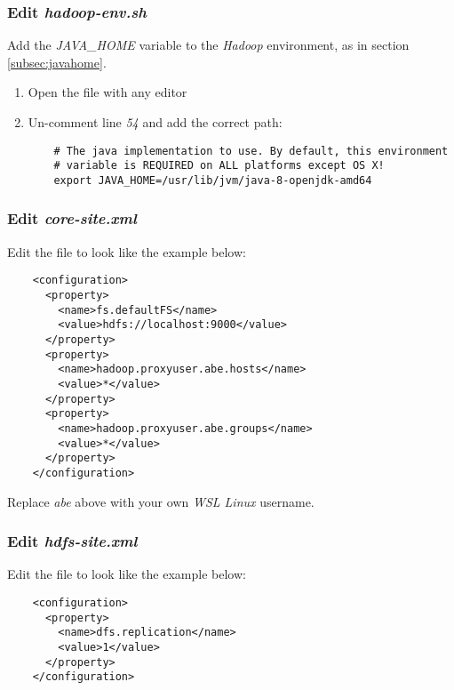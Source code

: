 \documentclass{article}
\begin{document}
    \subsubsection{Edit \emph{hadoop-env.sh}}
    Add the \emph{JAVA\_HOME} variable to the \emph{Hadoop} environment, as in section
    \ref{subsec:javahome}.
    \begin{enumerate}
    \item Open the file  with any editor
    
    \item Un-comment line \emph{54} and add the correct path:
    \begin{verbatim}
    # The java implementation to use. By default, this environment
    # variable is REQUIRED on ALL platforms except OS X!
    export JAVA_HOME=/usr/lib/jvm/java-8-openjdk-amd64
    \end{verbatim}
    \end{enumerate}

    \subsubsection{Edit \emph{core-site.xml}}
    Edit the file  to look like the example below:
    \begin{verbatim}
    <configuration>
      <property>
        <name>fs.defaultFS</name>
        <value>hdfs://localhost:9000</value>
      </property>
      <property>
        <name>hadoop.proxyuser.abe.hosts</name>
        <value>*</value>
      </property>
      <property>
        <name>hadoop.proxyuser.abe.groups</name>
        <value>*</value>
      </property>
    </configuration>
    \end{verbatim}
    Replace \emph{abe} above with your own \emph{WSL Linux} username.

    \subsubsection{Edit \emph{hdfs-site.xml}}
    Edit the file  to look like the example below:
    \begin{verbatim}
    <configuration>
      <property>
        <name>dfs.replication</name>
        <value>1</value>
      </property>
    </configuration>
    \end{verbatim}
        
\end{document}
